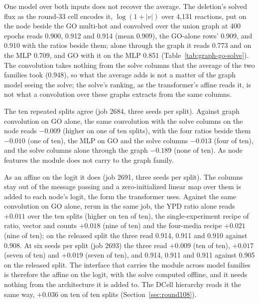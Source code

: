 



One model over both inputs does not recover the average. The deletion's solved flux
as the round-33 cell encodes it, $\log(1 + |v|)$ over 4,131 reactions, put on the
node beside the GO multi-hot and convolved over the union graph at 400 epochs reads
0.900, 0.912 and 0.914 (mean 0.909), the GO-alone rows' 0.909, and 0.910 with the
ratios beside them; alone through the graph it reads 0.773 and on the MLP 0.709, and
GO with it on the MLP 0.851 (Table~\ref{tab:graph-go-solve}). The convolution takes
nothing from the solve columns that the average of the two families took (0.948),
so what the average adds is not a matter of the graph model seeing the solve; the
solve's ranking, as the transformer's affine reads it, is not what a convolution
over these graphs extracts from the same columns.

The ten repeated splits agree (job 2684, three seeds per split). Against graph
convolution on GO alone, the same convolution with the solve columns on the node reads
$-0.009$ (higher on one of ten splits), with the four ratios beside them $-0.010$ (one
of ten), the MLP on GO and the solve columns $-0.013$ (four of ten), and the solve
columns alone through the graph $-0.189$ (none of ten). As node features the module does not carry to the graph family.

As an affine on the logit it does (job 2691, three seeds per split). The columns stay out
of the message passing and a zero-initialized linear map over them is added to each
node's logit, the form the transformer uses. Against the same convolution on GO alone,
rerun in the same job, the YPD ratio alone reads $+0.011$ over the ten splits (higher on
ten of ten), the single-experiment recipe of ratio, vector and counts $+0.018$ (nine of
ten) and the four-media recipe $+0.021$ (nine of ten); on the released split the three
read 0.914, 0.911 and 0.910 against 0.908. At six seeds per split (job 2693) the three
read $+0.009$ (ten of ten), $+0.017$ (seven of ten) and $+0.019$ (seven of ten), and
0.914, 0.911 and 0.911 against 0.905 on the released split. The interface that carries the module across
model families is therefore the affine on the logit, with the solve computed offline, and
it needs nothing from the architecture it is added to. The DCell hierarchy reads it the same
way, $+0.036$ on ten of ten splits (Section~\ref{sec:round108}).

